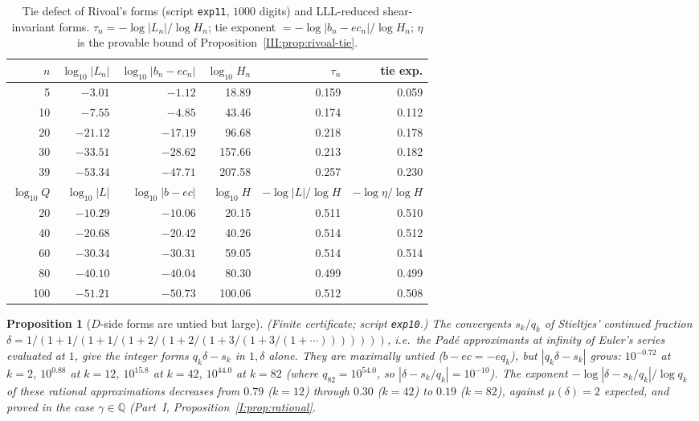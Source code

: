 \documentclass[11pt,a4paper]{article}
\newcommand{\Q}{\mathbb Q}
\newtheorem{proposition}[theorem]{Proposition}
\theoremstyle{definition}
\theoremstyle{remark}
\numberwithin{equation}{section}
\begin{document}
\begin{table}[t]
\centering\small
\caption{Tie defect of Rivoal's forms (script \texttt{exp11}, $1000$ digits) and
LLL-reduced shear-invariant forms. $\tau_n=-\log|L_n|/\log H_n$;
tie exponent $=-\log|b_n-ec_n|/\log H_n$; $\eta$ is the provable bound of
Proposition~\ref{III:prop:rivoal-tie}.}
\label{III:tab:tie}
\begin{tabular}{@{}rrrrrr@{}}
\toprule
$n$ & $\log_{10}|L_n|$ & $\log_{10}|b_n-ec_n|$ & $\log_{10}H_n$ & $\tau_n$ & tie exp.\\
\midrule
5 & $-3.01$ & $-1.12$ & 18.89 & 0.159 & 0.059\\
10 & $-7.55$ & $-4.85$ & 43.46 & 0.174 & 0.112\\
20 & $-21.12$ & $-17.19$ & 96.68 & 0.218 & 0.178\\
30 & $-33.51$ & $-28.62$ & 157.66 & 0.213 & 0.182\\
39 & $-53.34$ & $-47.71$ & 207.58 & 0.257 & 0.230\\
\midrule
$\log_{10}Q$ & $\log_{10}|L|$ & $\log_{10}|b-ec|$ & $\log_{10}H$ & $-\log|L|/\log H$ & $-\log\eta/\log H$\\
\midrule
20 & $-10.29$ & $-10.06$ & 20.15 & 0.511 & 0.510\\
40 & $-20.68$ & $-20.42$ & 40.26 & 0.514 & 0.512\\
60 & $-30.34$ & $-30.31$ & 59.05 & 0.514 & 0.514\\
80 & $-40.10$ & $-40.04$ & 80.30 & 0.499 & 0.499\\
100 & $-51.21$ & $-50.73$ & 100.06 & 0.512 & 0.508\\
\bottomrule
\end{tabular}
\end{table}

\begin{proposition}[$D$-side forms are untied but large]\label{III:prop:stieltjes}
\textup{(Finite certificate; script \texttt{exp10}.)} The convergents $s_k/q_k$ of
Stieltjes' continued fraction
$\delta=1/(1+1/(1+1/(1+2/(1+2/(1+3/(1+3/(1+\cdots)))))))$, i.e.\ the Pad\'e approximants at
infinity of Euler's series evaluated at $1$, give the integer forms $q_k\delta-s_k$ in
$1,\delta$ alone. They are maximally untied ($b-ec=-eq_k$), but
$|q_k\delta-s_k|$ grows: $10^{-0.72}$ at $k=2$, $10^{0.88}$ at $k=12$, $10^{15.8}$ at
$k=42$, $10^{44.0}$ at $k=82$ (where $q_{82}=10^{54.0}$, so $|\delta-s_k/q_k|=10^{-10}$).
The exponent $-\log|\delta-s_k/q_k|/\log q_k$ of these rational approximations decreases
from $0.79$ ($k=12$) through $0.30$ ($k=42$) to $0.19$ ($k=82$), against $\mu(\delta)=2$
expected, and proved in the case $\gamma\in\Q$ (Part~I, Proposition~\ref{I:prop:rational}.
\end{proposition}
\end{document}
